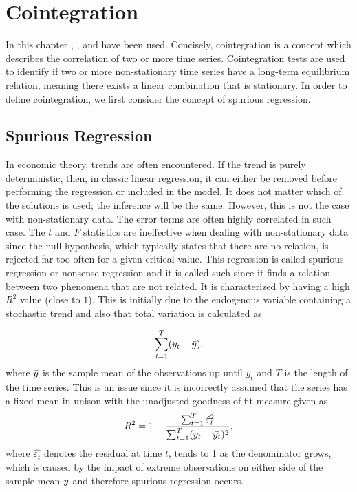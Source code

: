 \chapter{Cointegration}\label{chap:Coint}
In this chapter \cite{Analysis_of_integrated_and_cointegrated_time_series_with_R}, \cite{Cointegration_intro}, and \cite{co-Integration_and_error_correction} have been used. 
\pause
Concisely, cointegration is a concept which describes the correlation of two or more time series. Cointegration tests are used to identify if two or more non-stationary time series have a long-term equilibrium relation, meaning there exists a linear combination that is stationary.
\newline
\noindent In order to define cointegration, we first consider the concept of spurious regression.



\section{Spurious Regression}
In economic theory, trends are often encountered. If the trend is purely deterministic, then, in classic linear regression, it can either be removed before performing the regression or included in the model. It does not matter which of the solutions is used; the inference will be the same. However, this is not the case with non-stationary data. The error terms are often highly correlated in such case. The $t$ and $F$ statistics are ineffective when dealing with non-stationary data since the null hypothesis, which typically states that there are no relation, is rejected far too often for a given critical value. This regression is called spurious regression or nonsense regression and it is called such since it finds a relation between two phenomena that are not related. It is characterized by having a high $R^2$ value (close to $1$). This is initially due to the endogenous variable containing a stochastic trend and also that total variation is calculated as


\begin{equation*}
    \sum_{t=1}^T(y_t-\Bar{y}),
\end{equation*}
where $\Bar{y}$ is the sample mean of the observations up until $y_t$ and $T$ is the length of the time series. This is an issue since it is incorrectly assumed that the series has a fixed mean in unison with the unadjusted goodness of fit measure given as
\begin{equation}
\label{goodness_of_fit_eq}
    R^2=1-\frac{\sum_{t=1}^T\hat{\varepsilon}^2_t}{\sum_{t=1}^T(y_t-\Bar{y_t})^2},
\end{equation}
where $\hat{\varepsilon_t}$ denotes the residual at time $t$, tends to 1 as the denominator grows, which is caused by the impact of extreme observations on either side of the sample mean $\Bar{y}$ and therefore spurious regression occurs. \bigskip \\

